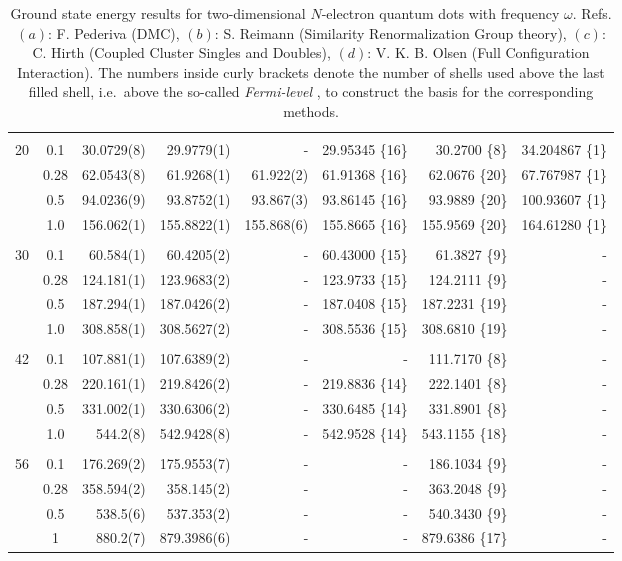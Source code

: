 \begin{table}
\begin{center}
\begin{tabular}{cc|rrrrrr}
\cline{2-8}
\multicolumn{8}{c}{} \\
    20    &   0.1    &  30.0729(8)  &  29.9779(1) & -		&29.95345 \{16\}	& 30.2700 \{8\} & 34.204867 \{1\}\\
          &   0.28   &  62.0543(8)  &  61.9268(1) & 61.922(2) &61.91368 \{16\}	& 62.0676 \{20\} & 67.767987 \{1\}\\
          &   0.5    &  94.0236(9)  &  93.8752(1) & 93.867(3) &93.86145 \{16\}	& 93.9889 \{20\} & 100.93607 \{1\}\\
          &   1.0    & 156.062(1)   & 155.8822(1) & 155.868(6)&155.8665 \{16\}	& 155.9569 \{20\}& 164.61280 \{1\}\\
\cline{2-8}
\multicolumn{8}{c}{} \\
    30    &   0.1    &  60.584(1)  &  60.4205(2)  & -		&60.43000 \{15\}	&  61.3827 \{9\}& -\\
          &   0.28   & 124.181(1)  & 123.9683(2)  & - 		&123.9733 \{15\}	& 124.2111 \{9\}& -\\
          &   0.5    & 187.294(1)  & 187.0426(2)  & - 		&187.0408 \{15\}	& 187.2231 \{19\}& -\\
          &   1.0    & 308.858(1)  & 308.5627(2)  & -	 	&308.5536 \{15\}	& 308.6810 \{19\}& -\\
\cline{2-8}
\multicolumn{8}{c}{} \\
    42    &   0.1    & 107.881(1)  & 107.6389(2)  & - 		&- 			& 111.7170 \{8\}& -\\
          &   0.28   & 220.161(1)  & 219.8426(2)  & - 		&219.8836 \{14\}	& 222.1401 \{8\}& -\\
          &   0.5    & 331.002(1)  & 330.6306(2)  & - 		&330.6485 \{14\}	& 331.8901 \{8\}& -\\
          &   1.0    & 544.2(8)    & 542.9428(8)  & - 		&542.9528 \{14\}	& 543.1155 \{18\}& -\\
\cline{2-8}
\multicolumn{8}{c}{} \\
    56    &   0.1    & 176.269(2) & 175.9553(7)   & -		& -		& 186.1034 \{9\} & -		\\
          &   0.28   & 358.594(2) & 358.145(2)    & -		& -		& 363.2048 \{9\} & -		\\
          &   0.5    & 538.5(6)   & 537.353(2)    & -		& -		& 540.3430 \{9\} & -		\\
          &   1      & 880.2(7)   & 879.3986(6)   & -		& -		& 879.6386 \{17\}& -		\\
\hline\hline


\end{tabular}
\caption{Ground state energy results for two-dimensional $N$-electron quantum dots with frequency $\omega$. Refs. $(a)$: F. Pederiva \cite{MagnusArticle} (DMC), $(b)$: S. Reimann \cite{Sarah} (Similarity Renormalization Group theory), $(c)$: C. Hirth \cite{Hirth} (Coupled Cluster Singles and Doubles), $(d)$: V. K. B. Olsen \cite{Olsen} (Full Configuration Interaction). The numbers inside curly brackets denote the number of shells used above the last filled shell, i.e.~above the so-called \textit{Fermi-level} \cite{Shavitt}, to construct the basis for the corresponding methods.}
\label{tab:QDotsResultsAll}
\end{center}
\end{table}
